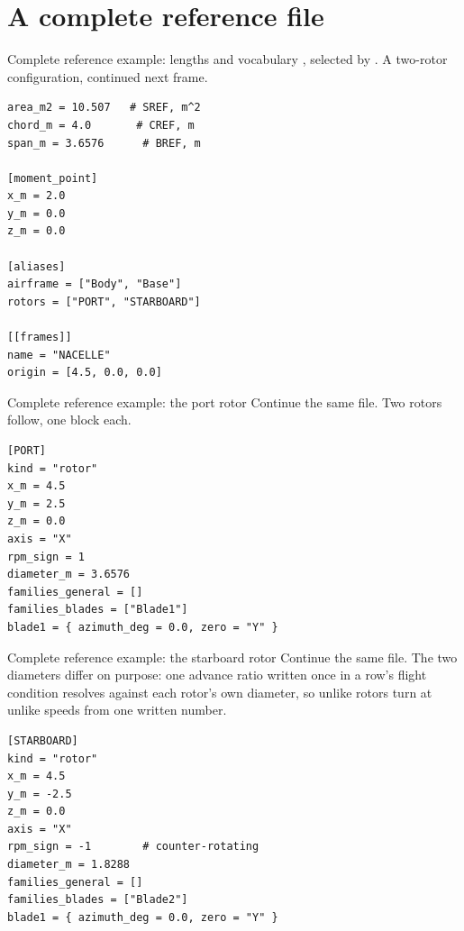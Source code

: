 %
\section{A complete reference file}

\begin{frame}[fragile]{Complete reference example: lengths and vocabulary}
\small {}, selected by .
A two-rotor configuration, continued next frame.
\begin{lstlisting}[basicstyle=\ttfamily\scriptsize,numbers=none]
area_m2 = 10.507   # SREF, m^2
chord_m = 4.0       # CREF, m
span_m = 3.6576      # BREF, m

[moment_point]
x_m = 2.0
y_m = 0.0
z_m = 0.0

[aliases]
airframe = ["Body", "Base"]
rotors = ["PORT", "STARBOARD"]

[[frames]]
name = "NACELLE"
origin = [4.5, 0.0, 0.0]
\end{lstlisting}
\end{frame}

\begin{frame}[fragile]{Complete reference example: the port rotor}
\small Continue the same file. Two rotors follow, one block each.
\begin{lstlisting}[basicstyle=\ttfamily\scriptsize,numbers=none]
[PORT]
kind = "rotor"
x_m = 4.5
y_m = 2.5
z_m = 0.0
axis = "X"
rpm_sign = 1
diameter_m = 3.6576
families_general = []
families_blades = ["Blade1"]
blade1 = { azimuth_deg = 0.0, zero = "Y" }
\end{lstlisting}
\end{frame}

\begin{frame}[fragile]{Complete reference example: the starboard rotor}
\small Continue the same file. The two diameters differ on purpose: one
advance ratio written once in a row's flight condition resolves against
each rotor's own diameter, so unlike rotors turn at unlike speeds from
one written number.
\begin{lstlisting}[basicstyle=\ttfamily\scriptsize,numbers=none]
[STARBOARD]
kind = "rotor"
x_m = 4.5
y_m = -2.5
z_m = 0.0
axis = "X"
rpm_sign = -1        # counter-rotating
diameter_m = 1.8288
families_general = []
families_blades = ["Blade2"]
blade1 = { azimuth_deg = 0.0, zero = "Y" }
\end{lstlisting}
\end{frame}
